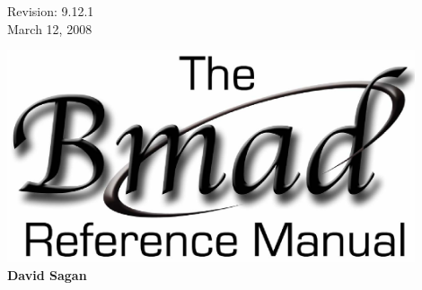 \thispagestyle{empty}

\begin{flushright}
\large
  Revision: 9.12.1 \\
  March 12, 2008 \\
\end{flushright}

\vfill

{
\begin{center}
\includegraphics[width=12cm]{bmad-ref-manual.eps} \\
\vskip 0.3in
\huge\bf David Sagan
\end{center}
}

\vfill
\break

